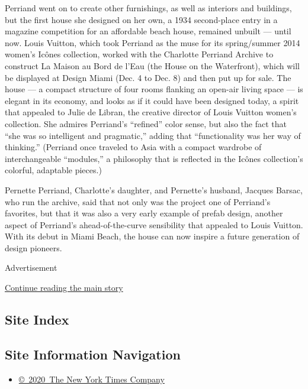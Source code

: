 Perriand went on to create other furnishings, as well as interiors and
buildings, but the first house she designed on her own, a 1934
second-place entry in a magazine competition for an affordable beach
house, remained unbuilt --- until now. Louis Vuitton, which took
Perriand as the muse for its spring/summer 2014 women's Icônes
collection, worked with the Charlotte Perriand Archive to construct La
Maison au Bord de l'Eau (the House on the Waterfront), which will be
displayed at Design Miami (Dec. 4 to Dec. 8) and then put up for sale.
The house --- a compact structure of four rooms flanking an open-air
living space --- is elegant in its economy, and looks as if it could
have been designed today, a spirit that appealed to Julie de Libran, the
creative director of Louis Vuitton women's collection. She admires
Perriand's ``refined'' color sense, but also the fact that ``she was so
intelligent and pragmatic,'' adding that ``functionality was her way of
thinking.'' (Perriand once traveled to Asia with a compact wardrobe of
interchangeable ``modules,'' a philosophy that is reflected in the
Icônes collection's colorful, adaptable pieces.)

Pernette Perriand, Charlotte's daughter, and Pernette's husband, Jacques
Barsac, who run the archive, said that not only was the project one of
Perriand's favorites, but that it was also a very early example of
prefab design, another aspect of Perriand's ahead-of-the-curve
sensibility that appealed to Louis Vuitton. With its debut in Miami
Beach, the house can now inspire a future generation of design pioneers.

Advertisement

\protect\hyperlink{after-bottom}{Continue reading the main story}

\hypertarget{site-index}{%
\subsection{Site Index}\label{site-index}}

\hypertarget{site-information-navigation}{%
\subsection{Site Information
Navigation}\label{site-information-navigation}}

\begin{itemize}
\tightlist
\item
  \href{https://help.nytimes3xbfgragh.onion/hc/en-us/articles/115014792127-Copyright-notice}{©~2020~The
  New York Times Company}
\end{itemize}

